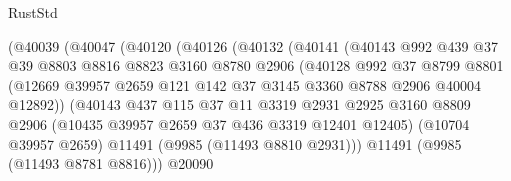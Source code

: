 \begin{lexlean}{RustStd}
\begin{coremodule}
                            (@40039
                              (@40047
                                (@40120
                                  (@40126
                                    (@40132
                                      (@40141
                                        (@40143
                                          @992
                                          @439
                                          @37
                                          @39
                                          @8803
                                          @8816
                                          @8823
                                          @3160
                                          @8780
                                          @2906
                                          (@40128
                                            @992
                                            @37
                                            @8799
                                            @8801
                                            (@12669
                                              @39957
                                              @2659
                                              @121
                                              @142
                                              @37
                                              @3145
                                              @3360
                                              @8788
                                              @2906
                                              @40004
                                              @12892))
                                          (@40143
                                            @437
                                            @115
                                            @37
                                            @11
                                            @3319
                                            @2931
                                            @2925
                                            @3160
                                            @8809
                                            @2906
                                            (@10435 @39957 @2659 @37 @436 @3319 @12401 @12405)
                                            (@10704 @39957 @2659)
                                            @11491
                                            (@9985 (@11493 @8810 @2931)))
                                          @11491
                                          (@9985 (@11493 @8781 @8816)))
                                        @20090

\end{coremodule}
\end{lexlean}
